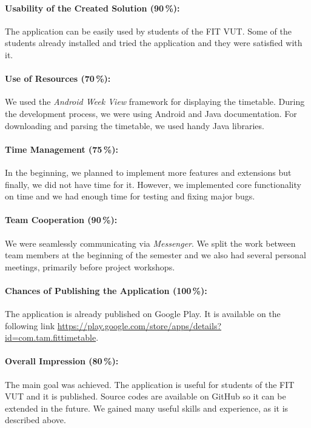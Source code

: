 \documentclass[12pt, a4paper, titlepage, final]{article}
\begin{document}
\paragraph{Usability of the Created Solution (90\,\%):}
The application can be easily used by students of the FIT VUT. Some of the
students already installed and tried the application and they were
satisfied with it.

\paragraph{Use of Resources (70\,\%):}
We used the \emph{Android Week View} framework for displaying the timetable.
During the development process, we were using Android and Java documentation.
For downloading and parsing the timetable, we used handy Java libraries.

\paragraph{Time Management (75\,\%):}
In the beginning, we planned to implement more features and extensions but
finally, we did not have time for it. However, we implemented core
functionality on time and we had enough time for testing and fixing major
bugs.

\paragraph{Team Cooperation (90\,\%):}
We were seamlessly communicating via \emph{Messenger}. We split the work
between team members at the beginning of the semester and we also had several
personal meetings, primarily before project workshops.

\paragraph{Chances of Publishing the Application (100\,\%):}
The application is already published on Google Play. It is available on the
following link
\url{https://play.google.com/store/apps/details?id=com.tam.fittimetable}.

\paragraph{Overall Impression (80\,\%):}
The main goal was achieved. The application is useful for students of the
FIT VUT and it is published. Source codes are available on GitHub so it can
be extended in the future. We gained many useful skills and experience, as
it is described above.
\end{document}
